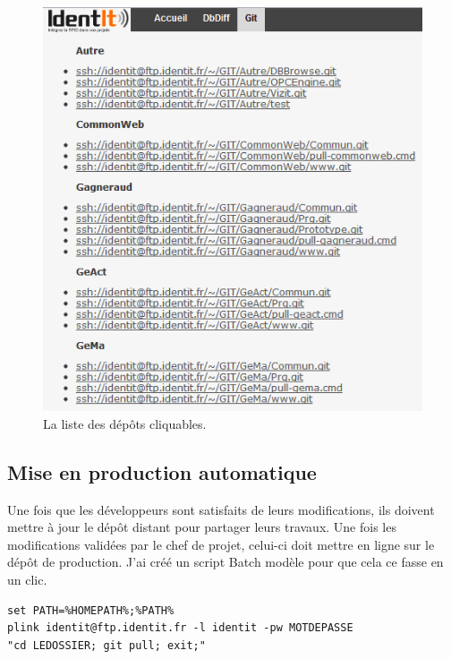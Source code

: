 \begin{figure}
\begin{center}
\includegraphics[scale=0.5]{images/repo.png}
\caption{La liste des dépôts cliquables.}
\label{repo}
\end{center}
\end{figure}


\subsection{Mise en production automatique} %

Une fois que les développeurs sont satisfaits de leurs modifications, ils
doivent mettre à jour le dépôt distant pour partager leurs travaux. Une fois
les modifications validées par le chef de projet, celui-ci doit mettre en ligne
sur le dépôt de production. J'ai créé un script Batch \og modèle \fg{} pour
que cela ce fasse en un clic.\\

\begin{lstlisting}[basicstyle=\ttfamily\small, frame=trBL]
set PATH=%HOMEPATH%;%PATH%
plink identit@ftp.identit.fr -l identit -pw MOTDEPASSE
"cd LEDOSSIER; git pull; exit;"
\end{lstlisting}

